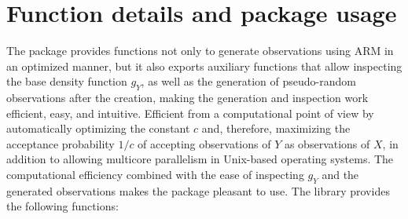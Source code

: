 \section{Function details and package usage}\label{function-details-and-package-usage}

The  package provides functions not only to generate observations using ARM in an optimized manner, but it also exports auxiliary functions that allow inspecting the base density function \(g_Y\), as well as the generation of pseudo-random observations after the creation, making the generation and inspection work efficient, easy, and intuitive. Efficient from a computational point of view by automatically optimizing the constant \(c\) and, therefore, maximizing the acceptance probability \(1/c\) of accepting observations of \(Y\) as observations of \(X\), in addition to allowing multicore parallelism in Unix-based operating systems. The computational efficiency combined with the ease of inspecting \(g_Y\) and the generated observations makes the package pleasant to use. The  library provides the following functions:

